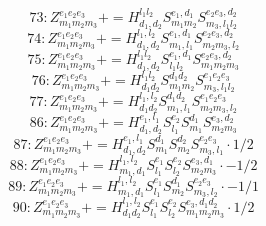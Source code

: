 \documentclass[letterpaper,10pt,fleqn,leqno,onecolumn]{article}
\begin{document}
\begin{equation} \;\;\;\;\;\;  73: Z^{e_{1}e_{2}e_{3}}_{m_{1}m_{2}m_{3}}+=H^{l_{1}l_{2}}_{d_{1},d_{2}}S^{e_{1},d_{1}}_{m_{1}m_{2}}S^{e_{2}e_{3},d_{2}}_{m_{3},l_{1}l_{2}} \end{equation}
\begin{equation} \;\;\;\;\;\;  74: Z^{e_{1}e_{2}e_{3}}_{m_{1}m_{2}m_{3}}+=H^{l_{1},l_{2}}_{d_{1},d_{2}}S^{e_{1},d_{1}}_{m_{1},l_{1}}S^{e_{2}e_{3},d_{2}}_{m_{2}m_{3},l_{2}} \end{equation}
\begin{equation} \;\;\;\;\;\;  75: Z^{e_{1}e_{2}e_{3}}_{m_{1}m_{2}m_{3}}+=H^{l_{1}l_{2}}_{d_{1},d_{2}}S^{e_{1},d_{1}}_{l_{1}l_{2}}S^{e_{2}e_{3},d_{2}}_{m_{1}m_{2}m_{3}} \end{equation}
\begin{equation} \;\;\;\;\;\;  76: Z^{e_{1}e_{2}e_{3}}_{m_{1}m_{2}m_{3}}+=H^{l_{1}l_{2}}_{d_{1}d_{2}}S^{d_{1}d_{2}}_{m_{1}m_{2}}S^{e_{1}e_{2}e_{3}}_{m_{3},l_{1}l_{2}} \end{equation}
\begin{equation} \;\;\;\;\;\;  77: Z^{e_{1}e_{2}e_{3}}_{m_{1}m_{2}m_{3}}+=H^{l_{1},l_{2}}_{d_{1}d_{2}}S^{d_{1}d_{2}}_{m_{1},l_{1}}S^{e_{1}e_{2}e_{3}}_{m_{2}m_{3},l_{2}} \end{equation}
\begin{equation} \;\;\;\;\;\;  86: Z^{e_{1}e_{2}e_{3}}_{m_{1}m_{2}m_{3}}+=H^{e_{1},l_{1}}_{d_{1},d_{2}}S^{e_{2}}_{l_{1}}S^{d_{1}}_{m_{1}}S^{e_{3},d_{2}}_{m_{2}m_{3}} \end{equation}
\begin{equation} \;\;\;\;\;\;  87: Z^{e_{1}e_{2}e_{3}}_{m_{1}m_{2}m_{3}}+=H^{e_{1},l_{1}}_{d_{1},d_{2}}S^{d_{1}}_{m_{1}}S^{d_{2}}_{m_{2}}S^{e_{2}e_{3}}_{m_{3},l_{1}}\cdot 1/2 \end{equation}
\begin{equation} \;\;\;\;\;\;  88: Z^{e_{1}e_{2}e_{3}}_{m_{1}m_{2}m_{3}}+=H^{l_{1},l_{2}}_{m_{1},d_{1}}S^{e_{1}}_{l_{1}}S^{e_{2}}_{l_{2}}S^{e_{3},d_{1}}_{m_{2}m_{3}}\cdot -1/2 \end{equation}
\begin{equation} \;\;\;\;\;\;  89: Z^{e_{1}e_{2}e_{3}}_{m_{1}m_{2}m_{3}}+=H^{l_{1},l_{2}}_{m_{1},d_{1}}S^{e_{1}}_{l_{1}}S^{d_{1}}_{m_{2}}S^{e_{2}e_{3}}_{m_{3},l_{2}}\cdot -1/1 \end{equation}
\begin{equation} \;\;\;\;\;\;  90: Z^{e_{1}e_{2}e_{3}}_{m_{1}m_{2}m_{3}}+=H^{l_{1},l_{2}}_{d_{1}d_{2}}S^{e_{1}}_{l_{1}}S^{e_{2}}_{l_{2}}S^{e_{3},d_{1}d_{2}}_{m_{1}m_{2}m_{3}}\cdot 1/2 \end{equation}
\end{document}
